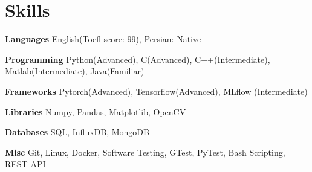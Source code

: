 
\section{Skills}
  \vspace{2pt}
  \resumeSubHeadingListStart
    \small{\item{

    \textbf{\color{MidnightBlue}Languages}{ English(Toefl score: 99), Persian: Native} \\ \vspace{3pt} %
    
    \textbf{\color{MidnightBlue}Programming}{ Python(Advanced), C(Advanced), C++(Intermediate), Matlab(Intermediate), Java(Familiar)} \\ \vspace{3pt} %

    \textbf{\color{MidnightBlue}Frameworks}{ Pytorch(Advanced), Tensorflow(Advanced), MLflow (Intermediate)}\\ \vspace{3pt} %

    \textbf{\color{MidnightBlue}Libraries}{ Numpy, Pandas, Matplotlib, OpenCV} \\ \vspace{3pt} %


    \textbf{\color{MidnightBlue}Databases}{ SQL, InfluxDB, MongoDB} \\ \vspace{3pt}

    \textbf{\color{MidnightBlue}Misc}{ Git, Linux, Docker, Software Testing, GTest, PyTest, Bash Scripting, REST API} \\ \vspace{3pt} %
            
    }}
  \resumeSubHeadingListEnd
